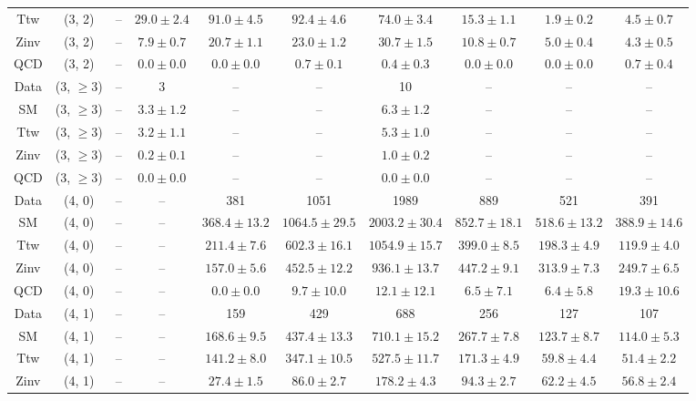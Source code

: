 \begin{table}[h!]
{\begin{tabular}{cccccccccc}
	Ttw & (3, 2) & -- & $29.0\pm 2.4$ & $91.0\pm 4.5$ & $92.4\pm 4.6$ & $74.0\pm 3.4$ & $15.3\pm 1.1$ & $1.9\pm 0.2$ & $4.5\pm 0.7$ \\[0.5ex] 
	Zinv & (3, 2) & -- & $7.9\pm 0.7$ & $20.7\pm 1.1$ & $23.0\pm 1.2$ & $30.7\pm 1.5$ & $10.8\pm 0.7$ & $5.0\pm 0.4$ & $4.3\pm 0.5$ \\[0.5ex] 
	QCD & (3, 2) & -- & $0.0\pm 0.0$ & $0.0\pm 0.0$ & $0.7\pm 0.1$ & $0.4\pm 0.3$ & $0.0\pm 0.0$ & $0.0\pm 0.0$ & $0.7\pm 0.4$ \\[0.5ex] 
	Data & (3, $\ge3$) & -- & 3 & -- & -- & 10 & -- & -- & -- \\[0.5ex] 
	SM & (3, $\ge3$) & -- & $3.3\pm 1.2$ & -- & -- & $6.3\pm 1.2$ & -- & -- & -- \\[0.5ex] 
	Ttw & (3, $\ge3$) & -- & $3.2\pm 1.1$ & -- & -- & $5.3\pm 1.0$ & -- & -- & -- \\[0.5ex] 
	Zinv & (3, $\ge3$) & -- & $0.2\pm 0.1$ & -- & -- & $1.0\pm 0.2$ & -- & -- & -- \\[0.5ex] 
	QCD & (3, $\ge3$) & -- & $0.0\pm 0.0$ & -- & -- & $0.0\pm 0.0$ & -- & -- & -- \\[0.5ex] 
	Data & (4, 0) & -- & -- & 381 & 1051 & 1989 & 889 & 521 & 391 \\[0.5ex] 
	SM & (4, 0) & -- & -- & $368.4\pm 13.2$ & $1064.5\pm 29.5$ & $2003.2\pm 30.4$ & $852.7\pm 18.1$ & $518.6\pm 13.2$ & $388.9\pm 14.6$ \\[0.5ex] 
	Ttw & (4, 0) & -- & -- & $211.4\pm 7.6$ & $602.3\pm 16.1$ & $1054.9\pm 15.7$ & $399.0\pm 8.5$ & $198.3\pm 4.9$ & $119.9\pm 4.0$ \\[0.5ex] 
	Zinv & (4, 0) & -- & -- & $157.0\pm 5.6$ & $452.5\pm 12.2$ & $936.1\pm 13.7$ & $447.2\pm 9.1$ & $313.9\pm 7.3$ & $249.7\pm 6.5$ \\[0.5ex] 
	QCD & (4, 0) & -- & -- & $0.0\pm 0.0$ & $9.7\pm 10.0$ & $12.1\pm 12.1$ & $6.5\pm 7.1$ & $6.4\pm 5.8$ & $19.3\pm 10.6$ \\[0.5ex] 
	Data & (4, 1) & -- & -- & 159 & 429 & 688 & 256 & 127 & 107 \\[0.5ex] 
	SM & (4, 1) & -- & -- & $168.6\pm 9.5$ & $437.4\pm 13.3$ & $710.1\pm 15.2$ & $267.7\pm 7.8$ & $123.7\pm 8.7$ & $114.0\pm 5.3$ \\[0.5ex] 
	Ttw & (4, 1) & -- & -- & $141.2\pm 8.0$ & $347.1\pm 10.5$ & $527.5\pm 11.7$ & $171.3\pm 4.9$ & $59.8\pm 4.4$ & $51.4\pm 2.2$ \\[0.5ex] 
	Zinv & (4, 1) & -- & -- & $27.4\pm 1.5$ & $86.0\pm 2.7$ & $178.2\pm 4.3$ & $94.3\pm 2.7$ & $62.2\pm 4.5$ & $56.8\pm 2.4$ \\[0.5ex] 

\end{tabular}}
\end{table}
